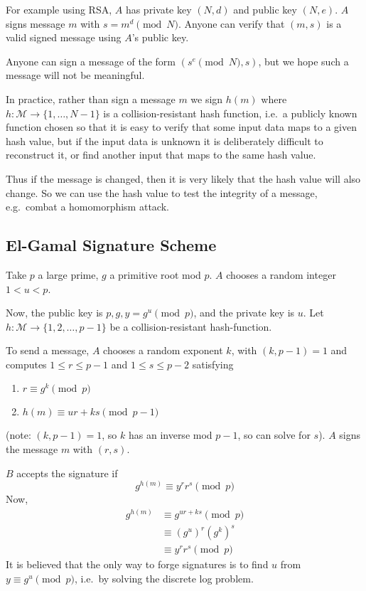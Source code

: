 \documentclass{article}
\newcommand{\1}[1]{\mathbbm{1}_{#1}}
\begin{document}
For example using RSA, $A$ has private key $(N, d)$ and public key $(N, e)$.
$A$ signs message $m$ with $s = m^d \pmod{N}$.
Anyone can verify that $(m, s)$ is a valid signed message using $A$'s public key.
\begin{remark}
    Anyone can sign a message of the form $(s^e \pmod{N}, s)$, but we hope such a message will not be meaningful.
\end{remark}

In practice, rather than sign a message $m$ we sign $h(m)$ where $h: \mathcal{M} \to \{1, \dotsc, N-1\}$ is a collision-resistant hash function, i.e.\ a publicly known function chosen so that it is easy to verify that some input data maps to
a given hash value, but if the input data is unknown it is deliberately difficult to reconstruct it, or find another input that maps to the same hash value.

Thus if the message is changed, then it is very likely that the hash value will also change. So we can use the hash value to test the integrity of a message, e.g.\ combat a homomorphism attack.

\subsection{El-Gamal Signature Scheme}
Take $p$ a large prime, $g$ a primitive root mod $p$.
$A$ chooses a random integer $1 < u < p$.

Now, the public key is $p, g, y = g^u \pmod{p}$, and the private key is $u$.
Let $h: \mathcal{M} \to \{1, 2, \dotsc, p-1\}$ be a collision-resistant hash-function.

To send a message, $A$ chooses a random exponent $k$, with $(k, p-1)=1$ and computes $1 \leq r \leq p-1$ and $1 \leq s \leq p-2$ satisfying
\begin{enumerate}[label=(\roman*)]
    \item $r \equiv g^k \pmod{p}$
    \item $h(m) \equiv ur + k s \pmod{p-1}$
\end{enumerate}
(note: $(k, p-1) = 1$, so $k$ has an inverse mod $p-1$, so can solve for $s$).
$A$ signs the message $m$ with $(r, s)$.

$B$ accepts the signature if
\begin{equation*}
    g^{h(m)} \equiv y^r r^s \pmod{p}
\end{equation*}
Now,
\begin{align*}
    g^{h(m)} &\equiv g^{ur + ks} \pmod{p} \\
             &\equiv (g^u)^r (g^k)^s \\
             &\equiv y^r r^s \pmod{p}
\end{align*}
It is believed that the only way to forge signatures is to find $u$ from $y \equiv g^u \pmod{p}$, i.e.\ by solving the discrete log problem.
\end{document}
